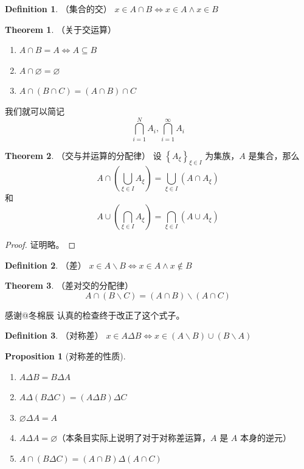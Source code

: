 \documentclass[oneside]{book}
\theoremstyle{definition}
\newtheorem{proposition}{Proposition}[section]
\newtheorem{definition}{Definition}[section]
\newtheorem{theorem}{Theorem}[section]
\begin{document}
		\begin{definition}
			（集合的交）
			$x\in A\cap B\Leftrightarrow x\in A\land x\in B$
		\end{definition}
		
		\begin{theorem}
			（关于交运算）
			\begin{enumerate}
				\item $A\cap B=A\Leftrightarrow A\subseteq B$
				\item $A\cap\varnothing=\varnothing$
				\item $A\cap \left(B\cap C\right)=\left(A\cap B\right)\cap C$
			\end{enumerate}
			我们就可以简记
			$$\bigcap_{i=1}^N A_i,\bigcap_{i=1}^\infty A_i$$
		\end{theorem}
		
		\begin{theorem}
			（交与并运算的分配律）
			设 $\left\{A_\xi\right\}_{\xi\in I}$ 为集族，$A$ 是集合，那么
			$$A\cap \left( \bigcup_{\xi \in I}{A_{\xi}} \right) =\bigcup_{\xi \in I}{\left( A\cap A_{\xi} \right)}$$
			和
			$$A\cup \left( \bigcap_{\xi \in I}{A_{\xi}} \right) =\bigcap_{\xi \in I}{\left( A\cup A_{\xi} \right)}$$
		\end{theorem}
		\begin{proof}
			证明略。
		\end{proof}
		\begin{definition}
			（差）
			$x\in A\backslash B\Leftrightarrow x\in A\land x\notin B$
		\end{definition}
		
		\begin{theorem}
			（差对交的分配律）
			$$A\cap \left( B\backslash C \right) =\left( A\cap B \right) \backslash \left( A\cap C \right) $$
		\end{theorem}
		 
		 感谢@冬棉辰 认真的检查终于改正了这个式子。
		\begin{definition}
			（对称差）
			$x\in A\Delta B\Leftrightarrow x\in \left( A\backslash B \right) \cup \left( B\backslash A \right)$
		\end{definition}
		
		\begin{proposition}[对称差的性质]
			\begin{enumerate}
				\item $A\Delta B=B\Delta A$
				\item $A\Delta\left(B\Delta C\right)=\left(A\Delta B\right)\Delta C$
				\item $\varnothing\Delta A=A$
				\item $A\Delta A=\varnothing$（本条目实际上说明了对于对称差运算，\(A\) 是 \(A\) 本身的逆元）
				\item $A\cap\left(B\Delta C\right)=\left( A\cap B \right) \Delta \left( A\cap C \right)$
			\end{enumerate}
		\end{proposition}
\end{document}
